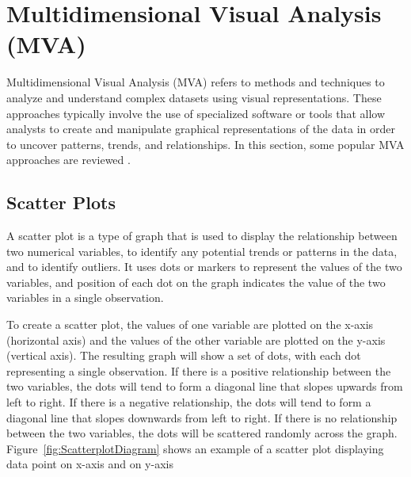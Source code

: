 
\chapter{Multidimensional Visual Analysis (MVA)}

\label{chap:MVA}

Multidimensional Visual Analysis (MVA) refers to methods and techniques to
analyze and understand complex datasets using visual representations.
These approaches typically involve the use of specialized software or
tools that allow analysts to create and manipulate graphical
representations of the data in order to uncover patterns, trends, and
relationships. In this section, some popular MVA approaches are reviewed
\parencites{cao2011mva}[Chapter~2]{dzemyda2012mva}.



\section{Scatter Plots}

A scatter plot is a type of graph that is used to display the
relationship between two numerical variables, to identify any
potential trends or patterns in the data, and to identify outliers. It
uses dots or markers to represent the values of the two variables, and
position of each dot on the graph indicates the value of the two
variables in a single observation.

To create a scatter plot, the values of one variable are plotted on the
x-axis (horizontal axis) and the values of the other variable are plotted
on the y-axis (vertical axis). The resulting graph will show a set of
dots, with each dot representing a single observation. If there is a
positive relationship between the two variables, the dots will tend to
form a diagonal line that slopes upwards from left to right. If there is a
negative relationship, the dots will tend to form a diagonal line that
slopes downwards from left to right. If there is no relationship between
the two variables, the dots will be scattered randomly across the graph.
Figure~\ref{fig:ScatterplotDiagram} shows an example of a scatter plot
displaying data point on x-axis and on y-axis

